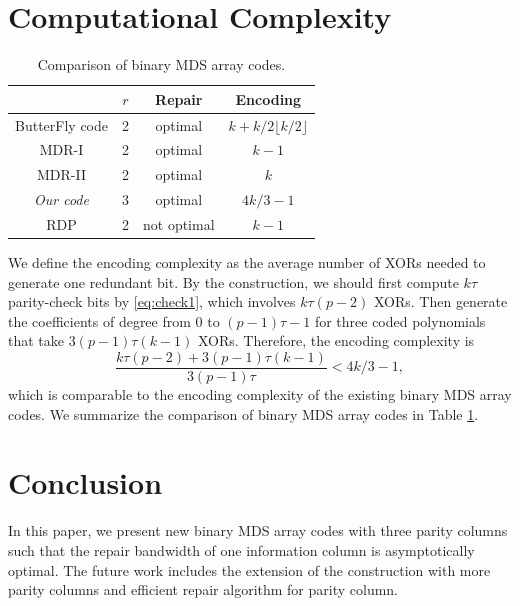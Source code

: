 \documentclass[conference]{IEEEtran}
\begin{document}
\section{Computational Complexity}
\begin{table}[tbh]
\caption{Comparison of binary MDS array codes.}
\begin{center}
\begin{tabular}{|c|c|c|c|} \hline
 &$r$ & Repair & Encoding  \\ \hline \hline
ButterFly code &2 &optimal &$k+k/2\lfloor k/2\rfloor$ \\ \hline
MDR-I \cite{Wang2013MDR} & 2 &optimal  &$k-1$\\ \hline
MDR-II \cite{Wang2013MDR} & 2 &optimal  &$k$\\ \hline
\emph{Our code} &3 &optimal &$4k/3-1$ \\ \hline
RDP &2 & not optimal &$k-1$ \\ \hline
\end{tabular}
\end{center}
\label{table:A}
\vspace{-0.5cm}
\end{table}

We define the encoding complexity as the average number of XORs needed to generate one redundant bit. By the construction, we should first compute $k\tau$ parity-check bits by \eqref{eq:check1}, which involves $k\tau(p-2)$ XORs. Then generate the coefficients of degree from 0 to $(p-1)\tau-1$ for three coded polynomials that take $3(p-1)\tau(k-1)$ XORs. Therefore, the encoding complexity is
\[
\frac{k\tau(p-2)+3(p-1)\tau(k-1)}{3(p-1)\tau}<4k/3-1,
\]
which is comparable to the encoding complexity of the existing binary MDS array codes. We summarize the comparison of binary MDS array codes in Table \ref{table:A}.

%

\section{Conclusion}
\label{sec:con}
In this paper, we present new binary MDS array codes with three parity columns such that the repair bandwidth of one information column is asymptotically optimal.
The future work includes the extension of the construction with more parity columns and efficient repair algorithm for parity column.

\appendices




\end{document}
